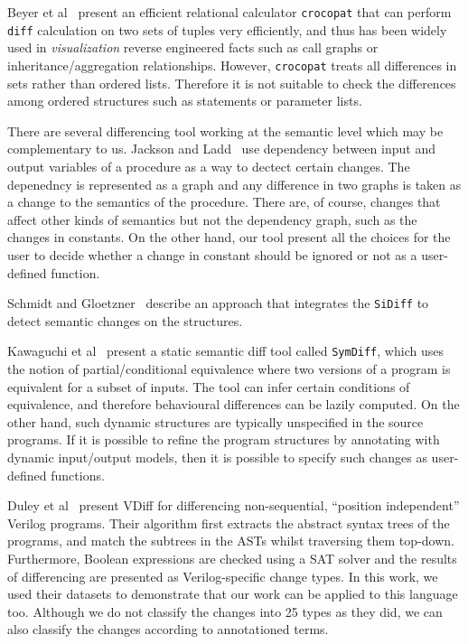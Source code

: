 \documentclass[10pt, conference, compsocconf]{IEEEtran}
\begin{document}
{Beyer et al~\cite{DBLP:journals/tse/BeyerNL04} present an efficient relational calculator {\tt crocopat} that can perform {\tt diff} calculation on two sets of tuples very efficiently, and thus has been widely used in {\em visualization} reverse engineered facts such as call graphs or inheritance/aggregation relationships. However, {\tt crocopat} treats all differences in sets rather than ordered lists. Therefore it is not suitable to check the differences among ordered structures such as statements or parameter lists.

\cite{fluri07tse}

There are several differencing tool working at the semantic level which may be complementary to us. Jackson and Ladd~\cite{Jackson:1994:SDT:645543.655704} use dependency between input and output variables of a procedure as a way to dectect certain changes. The depenedncy is represented as a graph and any difference in two graphs is taken as a change to the semantics of the procedure. There are, of course, changes that affect other kinds of semantics but not the dependency graph, such as the changes in constants. On the other hand, our tool present all the choices for the user to decide whether a change in constant should be ignored or not as a user-defined function.

Schmidt and Gloetzner~\cite{schmidt08icse} describe an approach that integrates the {\tt SiDiff} to detect semantic changes on the structures. 

Kawaguchi et al~\cite{Kawaguchietal2010} present a static semantic diff tool called {\tt SymDiff}, which uses the notion of partial/conditional equivalence where two versions of a program is equivalent for a subset of inputs.  The tool can infer certain conditions of equivalence, and therefore behavioural differences can be lazily computed. On the other hand, such dynamic structures are typically unspecified in the source programs. If it is possible to refine the program structures by annotating with dynamic input/output models, then it is possible to specify such changes as user-defined functions. 

Duley et al~\cite{Duley:2010:PDA:1858996.1859093} present VDiff for differencing non-sequential, ``position independent'' Verilog programs. Their algorithm first extracts the abstract syntax trees of the programs, and match the subtrees in the ASTs whilst traversing them top-down. Furthermore, Boolean expressions are checked using a SAT solver and the results of differencing are presented as Verilog-specific change types. In this work, we used their datasets to demonstrate that our work can be applied to this language too. Although we do not classify the changes into 25 types as they did, we can also classify the changes according to annotationed terms.

}
\end{document}
